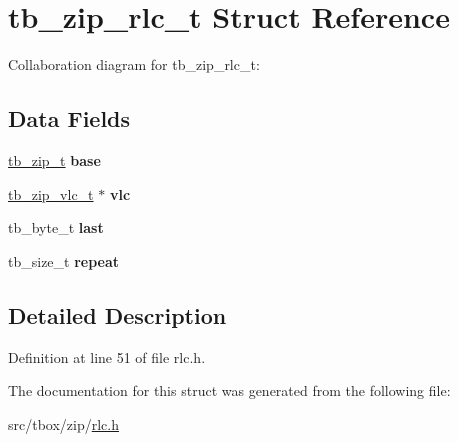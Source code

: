 \hypertarget{structtb__zip__rlc__t}{\section{tb\-\_\-zip\-\_\-rlc\-\_\-t Struct Reference}
\label{structtb__zip__rlc__t}
}


Collaboration diagram for tb\-\_\-zip\-\_\-rlc\-\_\-t\-:
\subsection*{Data Fields}
\begin{DoxyCompactItemize}
\item 
\hypertarget{structtb__zip__rlc__t_a6544b40834db731663615d250334c893}{\hyperlink{structtb__zip__t}{tb\-\_\-zip\-\_\-t} {\bfseries base}}\label{structtb__zip__rlc__t_a6544b40834db731663615d250334c893}

\item 
\hypertarget{structtb__zip__rlc__t_a4cb0091183fd9ddadb6e9edb32fe9e65}{\hyperlink{structtb__zip__vlc__t}{tb\-\_\-zip\-\_\-vlc\-\_\-t} $\ast$ {\bfseries vlc}}\label{structtb__zip__rlc__t_a4cb0091183fd9ddadb6e9edb32fe9e65}

\item 
\hypertarget{structtb__zip__rlc__t_a1d29ebd62080a3ab8c7a285209612cad}{tb\-\_\-byte\-\_\-t {\bfseries last}}\label{structtb__zip__rlc__t_a1d29ebd62080a3ab8c7a285209612cad}

\item 
\hypertarget{structtb__zip__rlc__t_a58a1343d8ef193a66c8c81f2efe3b07f}{tb\-\_\-size\-\_\-t {\bfseries repeat}}\label{structtb__zip__rlc__t_a58a1343d8ef193a66c8c81f2efe3b07f}

\end{DoxyCompactItemize}


\subsection{Detailed Description}


Definition at line 51 of file rlc.\-h.



The documentation for this struct was generated from the following file\-:\begin{DoxyCompactItemize}
\item 
src/tbox/zip/\hyperlink{rlc_8h}{rlc.\-h}\end{DoxyCompactItemize}
